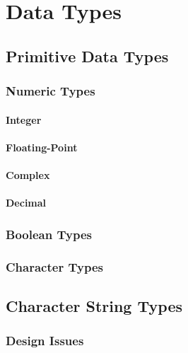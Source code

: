 \section{Data Types}\label{sec:Data_Types}
\subsection{Primitive Data Types}\label{subsec:Primitive_Data_Types}
\subsubsection{Numeric Types}\label{subsubsec:Numeric_Primitive_Data_Types}
\paragraph{Integer}\label{par:Integer_Numeric_Primitive_Data_Type}
\paragraph{Floating-Point}\label{par:Floating_Point_Numeric_Primitive_Data_Type}
\paragraph{Complex}\label{par:Complex_Numeric_Primitive_Data_Type}
\paragraph{Decimal}\label{par:Decimal_Numeric_Primitive_Data_Type}

\subsubsection{Boolean Types}\label{subsubsec:Boolean_Primitive_Data_Types}
\subsubsection{Character Types}\label{subsubsec:Character_Primitive_Data_Types}

\subsection{Character String Types}\label{subsec:Character_String_Types}
\subsubsection{Design Issues}\label{subsubsec:Character_String_Types_Design_Issues}
